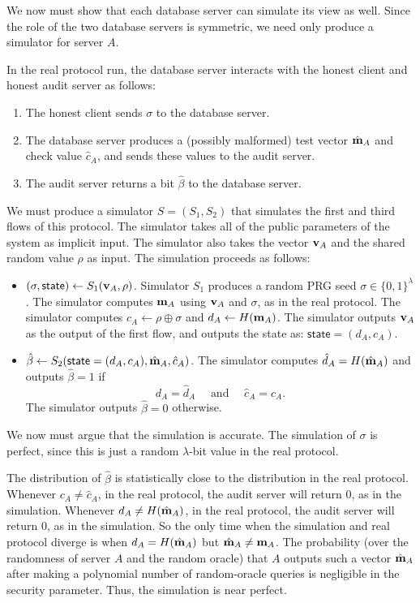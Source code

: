 \documentclass[10pt,twocolumn]{article}
\newcommand{\hbet}{\hat{\beta}}
\newcommand{\lbits}{\{0,1\}^\lambda}
\newcommand{\mA}{{\bf m}_A}
\newcommand{\hmA}{\hat{{\bf m}}_A}
\newcommand{\vA}{{\bf v}_A}
\newcommand{\state}{\textsf{state}}
\begin{document}
\medskip

We now must show that each database server can simulate
its view as well.
Since the role of the two database servers is symmetric, we need only
produce a simulator for server $A$.

In the real protocol run, the database server interacts
with the honest client and honest audit server as follows:
\begin{enumerate}
  \item The honest client sends $\sigma$ to the database server.
  \item The database server produces a (possibly malformed) test vector
    $\hmA$ and check value $\hat{c}_A$, and sends these values to the audit server.
  \item The audit server returns a bit $\hbet$ to the database server.
\end{enumerate}

We must produce a simulator $S = (S_1, S_2)$ that simulates the first
and third flows of this protocol.
The simulator takes all of the public parameters of the system as implicit
input.
The simulator also takes the vector $\vA$ and the shared random value
$\rho$ as input.
The simulation proceeds as follows:
\begin{itemize}
  \item $(\sigma, \state) \gets S_1(\vA, \rho)$. 
        Simulator $S_1$ produces a random PRG seed
        $\sigma \in \lbits$. 
        The simulator computes $\mA$ using $\vA$ and $\sigma$, 
        as in the real protocol.
        The simulator computes $c_A \gets \rho \oplus \sigma$
        and $d_A \gets H(\mA)$.
        The simulator outputs $\vA$ as the output of the first flow, and outputs
        the state as:
        ${\state = (d_A, c_A)}$.
      \item $\hat{\beta} \gets S_2(\state = (d_A, c_A), \hmA, \hat{c}_A)$.
        The simulator computes ${\hat{d}_A = H(\hmA)}$ and outputs
        $\hat{\beta} = 1$ if 
        \[ d_A = \hat{d}_A\quad\text{ and }\quad \hat{c}_A = c_A.\]
        The simulator outputs
        $\hat{\beta} = 0$ otherwise.
\end{itemize}

We now must argue that the simulation is accurate.
The simulation of $\sigma$ is perfect, since
this is just a random $\lambda$-bit value in the real protocol.

The distribution of $\hat{\beta}$ is 
statistically close to the distribution in the real protocol.
Whenever $c_A \neq \hat{c}_A$, in the real protocol, the audit
server will return $0$, as in the simulation.
Whenever $d_A \neq H(\hmA)$, in the real protocol, the audit
server will return $0$, as in the simulation.
So the only time when the simulation and real protocol diverge
is when $d_A = H(\hmA)$ but $\hmA \neq \mA$.
The probability (over the randomness of server $A$ and 
the random oracle) that $A$ outputs such a vector $\hmA$
after making a polynomial number of random-oracle queries
is negligible in the security parameter.
Thus, the simulation is near perfect.
\end{document}

